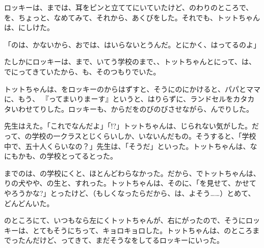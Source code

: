 ロッキーは、までは、耳をピンと立ててにいていたけど、のわりのところで、を、ちょっと、なめてみて、それから、あくびをした。それでも、トットちゃんは、にしけた。

「のは、かないから、おでは、はいらないとうんだ。とにかく、はってるのよ」

たしかにロッキーは、まで、いてう学校のまで、、トットちゃんとにって、は、でにってきていたから、も、そのつもりでいた。

トットちゃんは、をロッキーのからはずすと、そうにのにかけると、パパとママに、もう、 『ってまいりまーす』というと、はりらずに、ランドセルをカタカタいわせてりした。ロッキーも、からだをのびのびさせながら、んでりした。

先生はえた。「これでなんだよ」「!?」トットちゃんは、じられない気がした。だって、の学校の一クラスとじくらいしか、いないんだもの。そうすると、「学校中で、五十人くらいなの？」先生は、「そうだ」といった。トットちゃんは、なにもかも、の学校とってるとった。

までのは、の学校にくと、ほとんどわらなかった。だから、でトットちゃんは、りの犬やや、の生と、すれった。トットちゃんは、そのに、「を見せて、かせてやろうかな?」とったけど、（もしくなったらだから、は、よそう……）とめて、どんどんいた。

のところにて、いつもなら左にくトットちゃんが、右にがったので、そうにロッキーは、とてもそうにちって、キョロキョロした。トットちゃんは、のところまでったんだけど、ってきて、まだそうなをしてるロッキーにいった。

